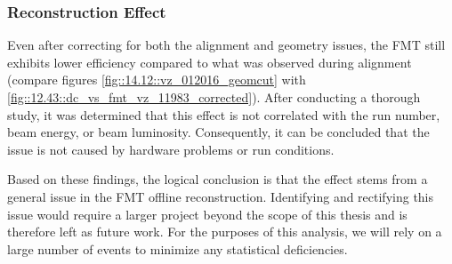 \subsubsection{Reconstruction Effect}
\label{14.13::reconstruction_effect}
    Even after correcting for both the alignment and geometry issues, the FMT still exhibits lower efficiency compared to what was observed during alignment (compare figures \ref{fig::14.12::vz_012016_geomcut} with \ref{fig::12.43::dc_vs_fmt_vz_11983_corrected}).
    After conducting a thorough study, it was determined that this effect is not correlated with the run number, beam energy, or beam luminosity.
    Consequently, it can be concluded that the issue is not caused by hardware problems or run conditions.

    Based on these findings, the logical conclusion is that the effect stems from a general issue in the FMT offline reconstruction.
    Identifying and rectifying this issue would require a larger project beyond the scope of this thesis and is therefore left as future work.
    For the purposes of this analysis, we will rely on a large number of events to minimize any statistical deficiencies.
